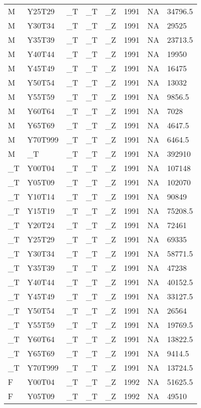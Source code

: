 \begin{longtable}[t]{llllllll}
M & Y25T29 & \_T & \_T & \_Z & 1991 & NA & 34796.5\\
M & Y30T34 & \_T & \_T & \_Z & 1991 & NA & 29525\\
\addlinespace
M & Y35T39 & \_T & \_T & \_Z & 1991 & NA & 23713.5\\
M & Y40T44 & \_T & \_T & \_Z & 1991 & NA & 19950\\
M & Y45T49 & \_T & \_T & \_Z & 1991 & NA & 16475\\
M & Y50T54 & \_T & \_T & \_Z & 1991 & NA & 13032\\
M & Y55T59 & \_T & \_T & \_Z & 1991 & NA & 9856.5\\
\addlinespace
M & Y60T64 & \_T & \_T & \_Z & 1991 & NA & 7028\\
M & Y65T69 & \_T & \_T & \_Z & 1991 & NA & 4647.5\\
M & Y70T999 & \_T & \_T & \_Z & 1991 & NA & 6464.5\\
M & \_T & \_T & \_T & \_Z & 1991 & NA & 392910\\
\_T & Y00T04 & \_T & \_T & \_Z & 1991 & NA & 107148\\
\addlinespace
\_T & Y05T09 & \_T & \_T & \_Z & 1991 & NA & 102070\\
\_T & Y10T14 & \_T & \_T & \_Z & 1991 & NA & 90849\\
\_T & Y15T19 & \_T & \_T & \_Z & 1991 & NA & 75208.5\\
\_T & Y20T24 & \_T & \_T & \_Z & 1991 & NA & 72461\\
\_T & Y25T29 & \_T & \_T & \_Z & 1991 & NA & 69335\\
\addlinespace
\_T & Y30T34 & \_T & \_T & \_Z & 1991 & NA & 58771.5\\
\_T & Y35T39 & \_T & \_T & \_Z & 1991 & NA & 47238\\
\_T & Y40T44 & \_T & \_T & \_Z & 1991 & NA & 40152.5\\
\_T & Y45T49 & \_T & \_T & \_Z & 1991 & NA & 33127.5\\
\_T & Y50T54 & \_T & \_T & \_Z & 1991 & NA & 26564\\
\addlinespace
\_T & Y55T59 & \_T & \_T & \_Z & 1991 & NA & 19769.5\\
\_T & Y60T64 & \_T & \_T & \_Z & 1991 & NA & 13822.5\\
\_T & Y65T69 & \_T & \_T & \_Z & 1991 & NA & 9414.5\\
\_T & Y70T999 & \_T & \_T & \_Z & 1991 & NA & 13724.5\\
F & Y00T04 & \_T & \_T & \_Z & 1992 & NA & 51625.5\\
\addlinespace
F & Y05T09 & \_T & \_T & \_Z & 1992 & NA & 49510\\

\end{longtable}
